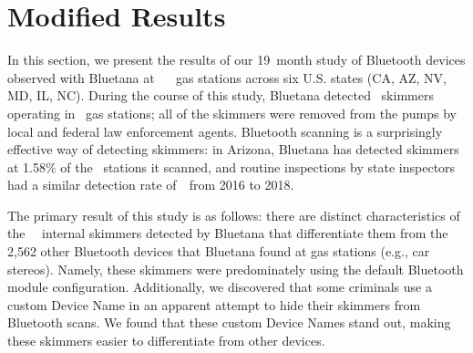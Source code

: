 
\section{Modified Results}
\label{sec:mod_bluetooth}

In this section, we present the results of our 19~month study of Bluetooth
devices observed with Bluetana at ~\visitedgasstations~ gas stations across six U.S.
states (CA, AZ, NV, MD, IL, NC).
%
During the course of this study, Bluetana detected \totalskimmers~skimmers operating in \Bluetanaskimstations~gas
stations; all of the skimmers were removed from the pumps by local and
federal law enforcement agents.
%
Bluetooth scanning is a surprisingly effective way of detecting skimmers: in
Arizona, Bluetana has detected skimmers at 1.58\% of the \visitedgasstationsAZ~stations it
scanned, and routine inspections by state
inspectors had a similar detection rate of~\azpercentskimfound~from 2016 to 2018.
 
The primary result of this study is as follows: there are distinct characteristics of the
~\totalskimmers~internal skimmers detected by Bluetana that differentiate
them from the 2,562 other Bluetooth devices that Bluetana found 
at gas stations (e.g., car stereos).
%
Namely, these skimmers were predominately using the default Bluetooth module configuration.
%
Additionally, we discovered that some criminals use a custom Device Name 
in an apparent attempt to hide their skimmers from Bluetooth scans.
%
We found that these custom Device Names stand out, making these skimmers easier to differentiate from other devices.


%

%

%




